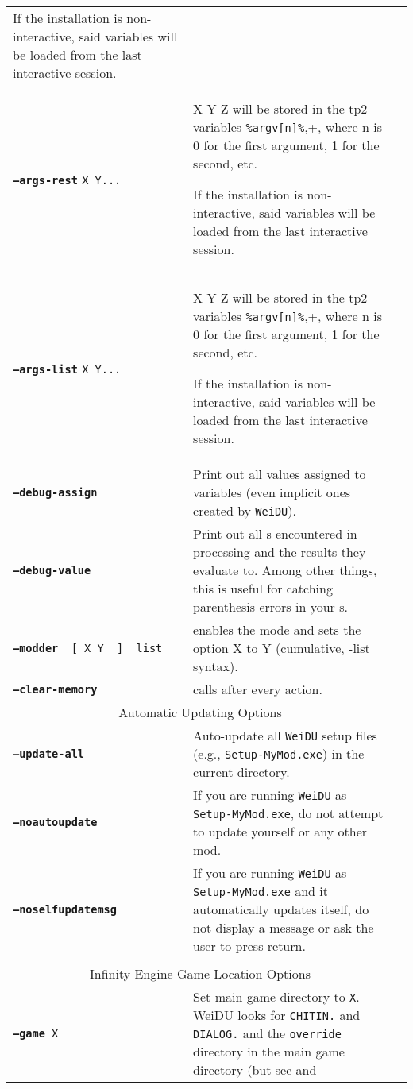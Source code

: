 \documentclass{article}
\def\ttref#1{\ahrefloc{#1}{\tt #1}}
\def\DEFINE#1{{\tt \bf #1}\label{#1}\index{#1}}
\def\t#1{{\tt #1}}
\def\Slist{{\color{red} list }}
\def\Ob{{\color{red} [ }}
\def\Oe{{\color{red} ] }}
\begin{document}
\begin{tabular}{lp{10in}|p{10in}}
If the installation is non-interactive, said variables will be loaded from the last interactive
session. \\
\DEFINE{--args-rest} \t{X Y...} & X Y Z will be stored in the tp2 variables \verb+%argv[n]%+,
where n is 0 for the first argument, 1 for the second, etc.

If the installation is non-interactive, said variables will be loaded from the last interactive
session. \\
\DEFINE{--args-list} \t{X Y...} & X Y Z will be stored in the tp2 variables \verb+%argv[n]%+,
where n is 0 for the first argument, 1 for the second, etc.

If the installation is non-interactive, said variables will be loaded from the last interactive
session. \\
\DEFINE{--debug-assign} & Print out all values assigned to \ttref{TP2}
variables (even implicit ones created by \t{WeiDU}). \\
\DEFINE{--debug-value} & Print out all \ttref{value}s encountered in
\ttref{TP2} processing and the results they evaluate to. Among other
things, this is useful for catching parenthesis errors in your
\ttref{value}s. \\
{\tt \DEFINE{--modder} \Ob X Y \Oe \Slist} & enables the
\ttref{MODDER} mode and sets the \ttref{MODDER} option X to Y (cumulative,
-list syntax).
\\
\DEFINE{--clear-memory} & calls \ttref{CLEAR!MEMORY} after every \ttref{TP2} action.
\\
\multicolumn{2}{c}{ \color{red} Automatic Updating Options } \\
\DEFINE{--update-all} & Auto-update all \t{WeiDU} setup files (e.g.,
\t{Setup-MyMod.exe}) in the current directory. \\
\DEFINE{--noautoupdate} & If you are running \t{WeiDU} as
\t{Setup-MyMod.exe}, do not attempt to update yourself or any other mod. \\
\DEFINE{--noselfupdatemsg} & If you are running \t{WeiDU} as
\t{Setup-MyMod.exe} and it automatically updates itself, do not display a
message or ask the user to press return. \\
\\
\multicolumn{2}{c}{ \color{red} Infinity Engine Game Location Options } \\
{\tt \DEFINE{--game} X	} & Set main game directory to {\tt X}. WeiDU looks for
{\tt CHITIN.}\ttref{KEY} and {\tt DIALOG.}\ttref{TLK} and the \t{override}
directory in the main game directory (but see \ttref{--tlkin} and

\end{tabular}
\end{document}
